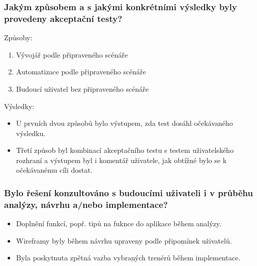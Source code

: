 \documentclass{beamer}
\begin{document}
\begin{frame}
  \frametitle{Jakým způsobem a s jakými konkrétními výsledky byly provedeny akceptační testy?}

  Způsoby:

  \begin{enumerate}
    \item Vývojář podle připraveného scénáře
    \item Automatizace podle připraveného scénáře
    \item Budoucí uživatel bez připraveného scénáře
  \end{enumerate}

  Výsledky:

  \begin{itemize}
    \item U prvních dvou způsobů bylo výstupem, zda test dosáhl očekávaného výsledku.
    \item Třetí způsob byl kombinací akceptačního testu s testem uživatelského rozhraní a výstupem byl i komentář uživatele, jak obtížné bylo se k očekávanému cíli dostat.
  \end{itemize}

\end{frame}
\begin{frame}
  \frametitle{Bylo řešení konzultováno s budoucími uživateli i v průběhu analýzy, návrhu a/nebo implementace?}

  \begin{itemize}
    \item Doplnění funkcí, popř. tipů na fuknce do aplikace během analýzy.
    \item Wireframy byly během návrhu upraveny podle připomínek uživatelů.
    \item Byla poskytnuta zpětná vazba vybraných trenérů během implementace.
  \end{itemize}
\end{frame}
\end{document}
